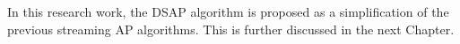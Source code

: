       

In this research work, the DSAP algorithm is proposed as a simplification of the previous streaming AP algorithms. This is further discussed in the next Chapter.







